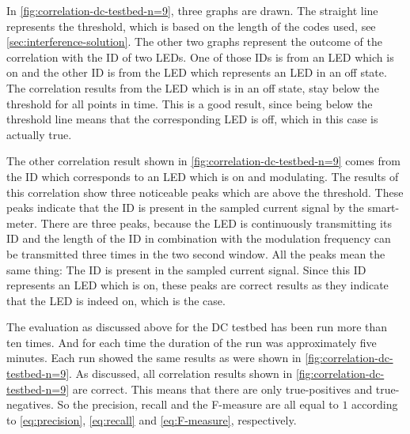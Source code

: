 In \autoref{fig:correlation-dc-testbed-n=9}, three graphs are drawn.
The straight line represents the threshold, which is based on the length of the codes used, see \autoref{sec:interference-solution}.
The other two graphs represent the outcome of the correlation with the ID of two LEDs.
One of those IDs is from an LED which is on and the other ID is from the LED which represents an LED in an off state.
The correlation results from the LED which is in an off state, stay below the threshold for all points in time.
This is a good result, since being below the threshold line means that the corresponding LED is off, which in this case is actually true.

The other correlation result shown in \autoref{fig:correlation-dc-testbed-n=9} comes from the ID which corresponds to an LED which is on and modulating.
The results of this correlation show three noticeable peaks which are above the threshold.
These peaks indicate that the ID is present in the sampled current signal by the smart-meter.
There are three peaks, because the LED is continuously transmitting its ID and the length of the ID in combination with the modulation frequency can be transmitted three times in the two second window.
All the peaks mean the same thing: The ID is present in the sampled current signal.
Since this ID represents an LED which is on, these peaks are correct results as they indicate that the LED is indeed on, which is the case.



The evaluation as discussed above for the DC testbed has been run more than ten times.
And for each time the duration of the run was approximately five minutes.
Each run showed the same results as were shown in \autoref{fig:correlation-dc-testbed-n=9}.
As discussed, all correlation results shown in \autoref{fig:correlation-dc-testbed-n=9} are correct.
This means that there are only true-positives and true-negatives.
So the precision, recall and the F-measure are all equal to $1$ according to \autoref{eq:precision}, \autoref{eq:recall} and \autoref{eq:F-measure}, respectively.


